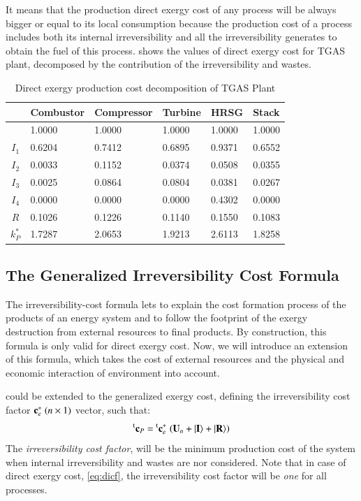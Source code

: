 \documentclass{ecos2018}
\begin{document}
It means that the production direct exergy cost of any process will be always bigger or equal to its local consumption because the production cost of a process includes both its internal irreversibility and all the irreversibility generates to obtain the fuel of this process.  shows the values of direct exergy cost for TGAS plant, decomposed by the contribution of the irreversibility and wastes.
\begin{table}[htbp]
	\caption{Direct exergy production cost decomposition of TGAS Plant}
	\begin{tabularx}{0.8\textwidth}{cZZZZZ}
		\addlinespace
		\toprule
		& Combustor & Compressor & Turbine & HRSG  & Stack \\
		\midrule
		& 1.0000 & 1.0000 & 1.0000 & 1.0000 & 1.0000 \\
		\midrule
		$I_1$ & 0.6204 & 0.7412 & 0.6895 & 0.9371 & 0.6552 \\
		$I_2$ & 0.0033 & 0.1152 & 0.0374 & 0.0508 & 0.0355 \\
		$I_3$ & 0.0025 & 0.0864 & 0.0804 & 0.0381 & 0.0267 \\
		$I_4$ & 0.0000 & 0.0000 & 0.0000 & 0.4302 & 0.0000 \\
		$R$   & 0.1026 & 0.1226 & 0.1140 & 0.1550 & 0.1083 \\
		\midrule
		$k_P^*$& 1.7287 & 2.0653 & 1.9213 & 2.6113 & 1.8258 \\
		\bottomrule
	\end{tabularx}
	\label{tab3}
\end{table}

\subsection{The Generalized Irreversibility Cost Formula}
The irreversibility-cost formula lets to explain the cost formation process of the products of an energy system and to follow the footprint of the exergy destruction from external resources to final products. By construction, this formula is only valid for direct exergy cost. Now, we will introduce an extension of this formula, which takes the cost of external resources and the physical and economic interaction of environment into account.

 could be extended to the generalized exergy cost, defining the irreversibility cost factor $\mathbf{c}_{e}^{*}\;(n\times1)$  vector, such that:
\begin{equation}
\prescript{\smash{\mathrm{t}}}{}{\mathbf{c}}_P=\prescript{\smash{\mathrm{t}}}{}{\mathbf{c}}_{e}^{*}\,\left(\mathbf{U}_n+\left| {\textbf{I} } \right\rangle+\left| {\textbf{R} } \right\rangle\right)
\end{equation}
The \emph{irreversibility cost factor}, will be the minimum production cost of the system when  internal irreversibility and wastes are nor considered. Note that in case of direct exergy cost, \cref{eq:dicf}, the irreversibility cost factor will be \emph{one} for all processes.
\end{document}
